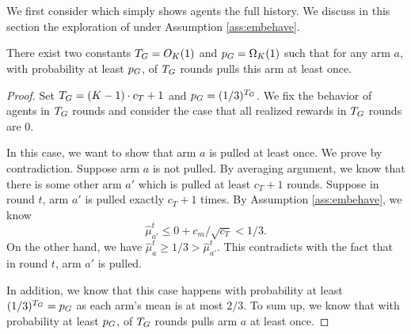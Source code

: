 \section{\ALGG}
We first consider \ALGG which simply shows agents the full history. We discuss in this section the exploration of \ALGG under Assumption \ref{ass:embehave}.

\begin{lemma}
\label{lem:greedy}
There exist two constants $T_G = O_K(1)$ and $p_G = \Omega_K(1)$ such that for any arm $a$, with probability at least $p_G$, \ALGG of $T_G$ rounds pulls this arm at least once. 
\end{lemma}

\begin{proof}
Set $T_G = (K-1) \cdot c_T + 1$ and $p_G = (1/3)^{T_G}$. We fix the behavior of agents in $T_G$ rounds and consider the case that all realized rewards in $T_G$ rounds are 0. 

In this case, we want to show that arm $a$ is pulled at least once. We prove by contradiction. Suppose arm $a$ is not pulled. By averaging argument, we know that there is some other arm $a'$ which is pulled at least $c_T + 1$ rounds. Suppose in round $t$, arm $a'$ is pulled exactly $c_T + 1$ times. By Assumption \ref{ass:embehave}, we know 
\[
\hat{\mu}_{a'}^t \leq 0 + c_m / \sqrt{c_T} < 1/3. 
\]
On the other hand, we have $\hat{\mu}_a^t \geq 1/3 > \hat{\mu}_{a'}^t$. This contradicts with the fact that in round $t$, arm $a'$ is pulled. 

In addition, we know that this case happens with probability at least $(1/3)^{T_G} = p_G$ as each arm's mean is at most $2/3$. To sum up, we know that with probability at least $p_G$, \ALGG of $T_G$ rounds pulls arm $a$ at least once. 
\end{proof}
